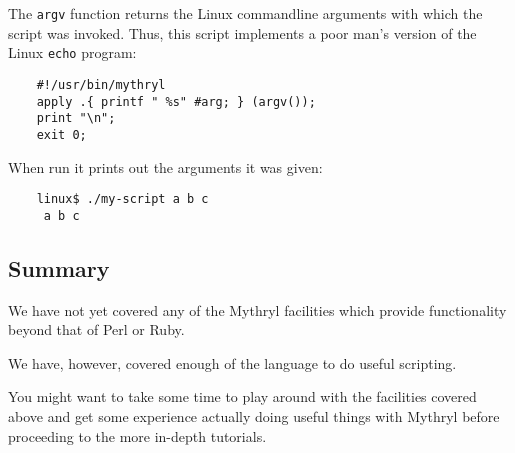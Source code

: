 The {\tt argv} function returns the Linux commandline arguments with which the 
script was invoked.  Thus, this script implements a poor man's version of the 
Linux {\tt echo} program:

\begin{verbatim}
    #!/usr/bin/mythryl
    apply .{ printf " %s" #arg; } (argv());
    print "\n";
    exit 0;
\end{verbatim}

When run it prints out the arguments it was given:

\begin{verbatim}
    linux$ ./my-script a b c
     a b c
\end{verbatim}

\cutend*


\subsection{Summary}

We have not yet covered any of the Mythryl facilities which provide functionality 
beyond that of Perl or Ruby.

We have, however, covered enough of the language to do useful scripting.

You might want to take some time to play around with the facilities 
covered above and get some experience actually doing useful things 
with Mythryl before proceeding to the more in-depth tutorials.

\cutend*